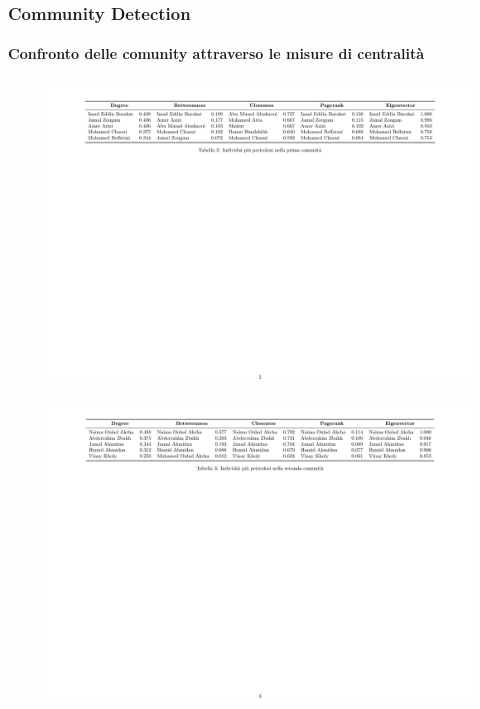 \documentclass[hyperref={pdfpagelabels=false}]{beamer}
\begin{document}
\begin{frame}
\frametitle{Community Detection}
\framesubtitle{Confronto delle comunity attraverso le misure di centralità}
\begin{figure}
  \centering
    \includegraphics[width=1\textwidth]{images/provaC1.pdf}
\end{figure}
\begin{figure}
  \centering
      \includegraphics[width=1\textwidth]{images/provaC2.pdf}%
\end{figure}

\end{frame}

\end{document}
